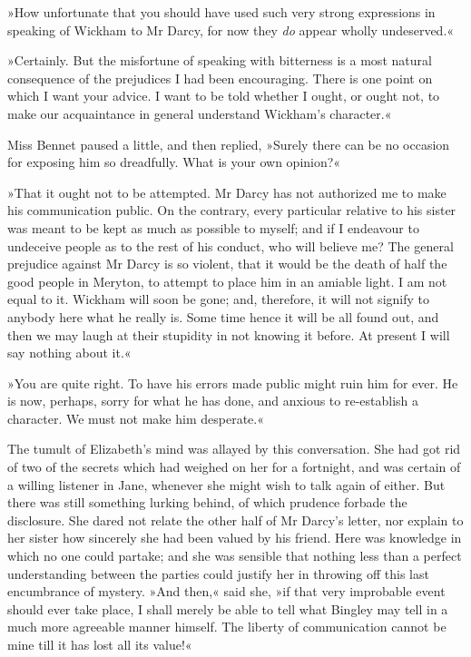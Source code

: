 »How unfortunate that you should have used such very strong expressions in speaking of Wickham to Mr Darcy, for now they \textit{do} appear wholly undeserved.«

»Certainly. But the misfortune of speaking with bitterness is a most natural consequence of the prejudices I had been encouraging. There is one point on which I want your advice. I want to be told whether I ought, or ought not, to make our acquaintance in general understand Wickham's character.«

Miss Bennet paused a little, and then replied, »Surely there can be no occasion for exposing him so dreadfully. What is your own opinion?«

»That it ought not to be attempted. Mr Darcy has not authorized me to make his communication public. On the contrary, every particular relative to his sister was meant to be kept as much as possible to myself; and if I endeavour to undeceive people as to the rest of his conduct, who will believe me? The general prejudice against Mr Darcy is so violent, that it would be the death of half the good people in Meryton, to attempt to place him in an amiable light. I am not equal to it. Wickham will soon be gone; and, therefore, it will not signify to anybody here what he really is. Some time hence it will be all found out, and then we may laugh at their stupidity in not knowing it before. At present I will say nothing about it.«

»You are quite right. To have his errors made public might ruin him for ever. He is now, perhaps, sorry for what he has done, and anxious to re-establish a character. We must not make him desperate.«

The tumult of Elizabeth's mind was allayed by this conversation. She had got rid of two of the secrets which had weighed on her for a fortnight, and was certain of a willing listener in Jane, whenever she might wish to talk again of either. But there was still something lurking behind, of which prudence forbade the disclosure. She dared not relate the other half of Mr Darcy's letter, nor explain to her sister how sincerely she had been valued by his friend. Here was knowledge in which no one could partake; and she was sensible that nothing less than a perfect understanding between the parties could justify her in throwing off this last encumbrance of mystery. »And then,« said she, »if that very improbable event should ever take place, I shall merely be able to tell what Bingley may tell in a much more agreeable manner himself. The liberty of communication cannot be mine till it has lost all its value!«


